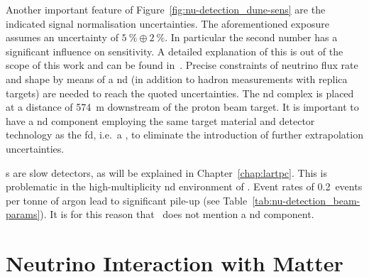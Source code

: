 Another important feature of Figure~\ref{fig:nu-detection_dune-sens} are the indicated signal normalisation uncertainties.
The aforementioned exposure assumes an uncertainty of $\SI{5}{\percent}\oplus\SI{2}{\percent}$.
In particular the second number has a significant influence on sensitivity.
A detailed explanation of this is out of the scope of this work and can be found in~\cite{dune2}.
Precise constraints of neutrino flux rate and shape by means of a \gls{nd} (in addition to hadron measurements with replica targets) are needed to reach the quoted uncertainties.
The \gls{nd} complex is placed at a distance of \SI{574}{\metre} downstream of the proton beam target.
It is important to have a \gls{nd} component employing the same target material and detector technology as the \gls{fd}, i.e.\ a \lartpc{}, to eliminate the introduction of further extrapolation uncertainties.

\lartpc{}s are slow detectors, as will be explained in Chapter~\ref{chap:lartpc}.
This is problematic in the high-multiplicity \gls{nd} environment of \dune{}.
Event rates of \num{0.2}~events per tonne of argon lead to significant pile-up (see Table~\ref{tab:nu-detection_beam-params}).
It is for this reason that~\cite{dune2} does not mention a \gls{nd} \lar{} component.


\section{Neutrino Interaction with Matter}
\label{sec:nu-detection_interactions}


